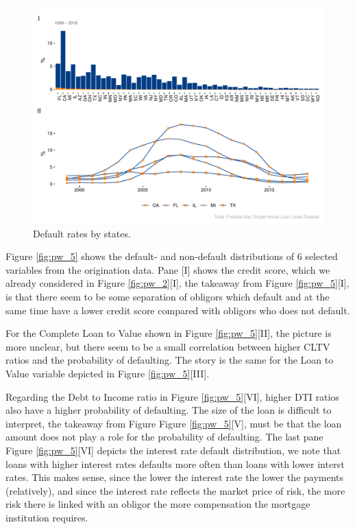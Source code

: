 \begin{figure}[H]
    \centering
    \includegraphics[width = \textwidth]{Figures/pw_3.pdf}
    \caption{Default rates by states.}
    \label{fig:pw_3}
\end{figure}

Figure \ref{fig:pw_5} shows the default- and non-default distributions of 6 selected variables from the origination data. Pane [I] shows the credit score, which we already considered in Figure \ref{fig:pw_2}[I], the takeaway from Figure \ref{fig:pw_5}[I], is that there seem to be some separation of obligors which default and at the same time have a lower credit score compared with obligors who does not default. 

For the Complete Loan to Value shown in Figure \ref{fig:pw_5}[II], the picture is more unclear, but there seem to be a small correlation between higher CLTV ratios and the probability of defaulting. The story is the same for the Loan to Value variable depicted in Figure \ref{fig:pw_5}[III]. 

Regarding the Debt to Income ratio in Figure \ref{fig:pw_5}[VI], higher DTI ratios also have a higher probability of defaulting. The size of the loan is difficult to interpret, the takeaway from Figure Figure \ref{fig:pw_5}[V], must be that the loan amount does not play a role for the probability of defaulting. The last pane Figure \ref{fig:pw_5}[VI] depicts the interest rate default distribution, we note that loans with higher interest rates defaults more often than loans with lower interst rates. This makes sense, since the lower the interest rate the lower the payments (relatively), and since the interest rate reflects the market price of risk, the more risk there is linked with an obligor the more compensation the mortgage institution requires.  


